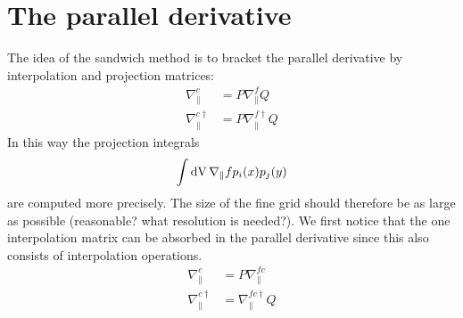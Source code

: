 \section{The parallel derivative}
The idea of the sandwich method \cite{Held2016} is to bracket the parallel derivative by interpolation and projection matrices:
\begin{align}
    \nabla^c_\parallel &= P\nabla_\parallel^f Q \\
    \nabla^{c\dagger}_\parallel &= P \nabla^{f\dagger}_\parallel Q
    \label{eq:sandwich}
\end{align}
In this way the projection integrals
\begin{align}
    \int\mathrm{dV}\, \nabla_\parallel f p_i(x)p_j(y) 
    \label{}
\end{align}
are computed more precisely.
The size of the fine grid should therefore be as large as
possible (reasonable? what resolution is needed?).
We first notice that the one interpolation matrix can be absorbed
in the parallel derivative since this also consists of 
interpolation operations. 
\begin{align}
    \nabla^c_\parallel &= P\nabla_\parallel^{fc} \\
    \nabla^{c\dagger}_\parallel &= \nabla^{fc\dagger}_\parallel Q
    \label{eq:sandwich}
\end{align}


